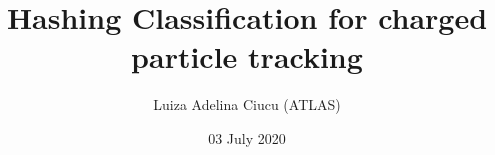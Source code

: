 \documentclass{beamer}
\title[Hashing classification for tracking ]{Hashing Classification for charged particle tracking}
\author[Luiza Adelina Ciucu (ATLAS) ]{Luiza Adelina Ciucu (ATLAS)}
\date{03 July 2020}
\begin{document}
\frame{\titlepage}


\newcommand\inputFolderMerge{../output_new_ev_000_100_min_10}
\newcommand\inputFolderMergedBalanced{../output_new_ev_000_100_min_10_balanced17}
\newcommand\inputFolderNN{../output_new_ev_000_100_min_10_NN_07}
\newcommand\inputFolderOverlay{../output_overlay_balanced_ev_000_100_Min10_17}


\def\volumeID{\texttt{\detokenize{volume_id}}}
\def\layerID{\texttt{\detokenize{layer_id}}}

\def\TP{\ifmmode {\mathrm{TP}}\else
                   \textrm{TP}\fi}%
\def\FP{\ifmmode {\mathrm{FP}}\else
                   \textrm{FP}\fi}%
\def\FN{\ifmmode {\mathrm{FN}}\else
                   \textrm{FN}\fi}%
\def\TN{\ifmmode {\mathrm{TN}}\else
                   \textrm{TN}\fi}%

\def\Ni{\ifmmode {\mathrm{N}_\mathrm{i}}\else
                   \textrm{N}_{\textrm{i}}\fi}%
\def\wi{\ifmmode {\mathrm{w}_\mathrm{i}}\else
                   \textrm{w}_{\textrm{i}}\fi}%
\def\xi{\ifmmode {\mathrm{x}_\mathrm{i}}\else
                   \textrm{x}_{\textrm{i}}\fi}%
\def\wzero{\ifmmode {\mathrm{w}_\mathrm{0}}\else
                   \textrm{w}_{\textrm{0}}\fi}%
\def\xzero{\ifmmode {\mathrm{x}_\mathrm{0}}\else
                   \textrm{x}_{\textrm{0}}\fi}%
                   
\end{document}
